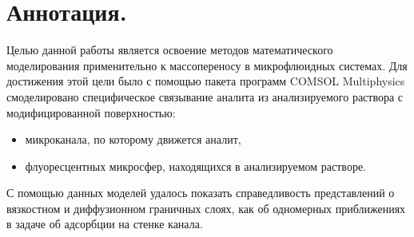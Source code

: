 \documentclass[oneside,final,12pt]{extreport}
\begin{document}


\setcounter{page}{2}

\section*{Аннотация.}
Целью данной работы является освоение методов математического моделирования
применительно к массопереносу в микрофлюидных системах.
Для достижения этой цели было с помощью пакета программ COMSOL Multiphysics\texttrademark{}
смоделировано специфическое связывание аналита из анализируемого раствора
с модифицированной поверхностью:
\begin{itemize}
  \item микроканала, по которому движется аналит,%
  \item флуоресцентных микросфер, находящихся в анализируемом растворе.

\end{itemize}


С помощью данных моделей удалось показать справедливость
представлений о вязкостном и диффузионном граничных слоях,
как об одномерных приближениях в задаче
об адсорбции на стенке канала.


\tableofcontents

\clearpage
\end{document}
